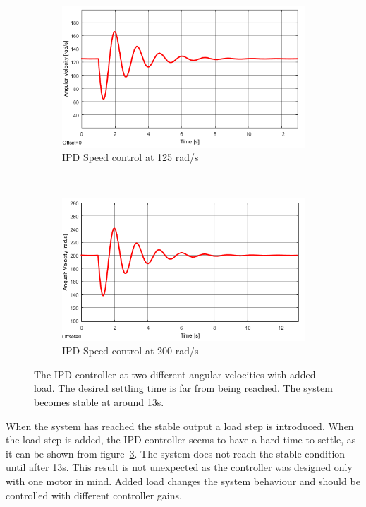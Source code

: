 \begin{figure}[h!]
	\centering
	\begin{subfigure}[b]{0.45\textwidth}
		\includegraphics[width=\textwidth]{graphics/IPD_load125}
		\caption{IPD Speed control at 125 rad/s}
		\label{fig:ipdload125}
	\end{subfigure}
	~ %
	\begin{subfigure}[b]{0.45\textwidth}
		\includegraphics[width=\textwidth]{graphics/IPD_load200}
		\caption{IPD Speed control at 200 rad/s}
		\label{fig:ipdload200}
	\end{subfigure}
	\caption{The IPD controller at two different angular velocities with added load. The desired settling time is far from being reached. The system becomes stable at around 13s.}
	\label{fig:ipdload}
\end{figure}

When the system has reached the stable output a load step is introduced.
When the load step is added, the IPD controller seems to have a hard time to settle, as it can be shown from figure~\ref{fig:ipdload}. The system does not reach the stable condition until after 13s.
This result is not unexpected as the controller was designed only with one motor in mind.
Added load changes the system behaviour and should be controlled with different controller gains.
